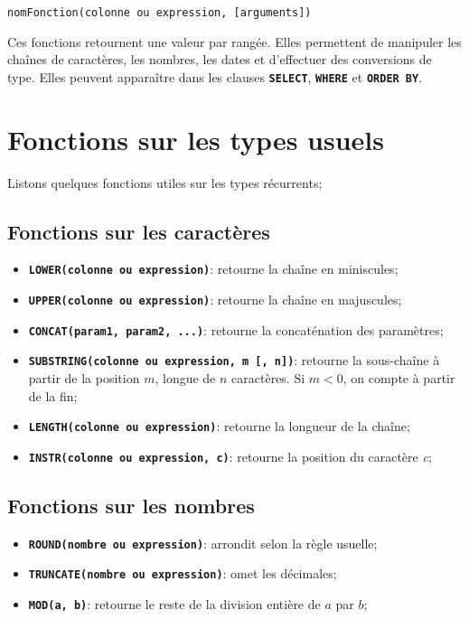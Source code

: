 \documentclass[a4paper, 12pt]{report}
\newcommand{\textSQL}[1]{\texttt{\textbf{#1}}}
\theoremstyle{definition} \newtheorem{ex}{Exemple}
\begin{document}
\begin{lstlisting}[frame=single]
nomFonction(colonne ou expression, [arguments])
\end{lstlisting}

Ces fonctions retournent une valeur par rangée. Elles permettent de manipuler les chaînes de caractères, les nombres, les dates et d'effectuer des conversions de type. Elles peuvent apparaître dans les clauses \textSQL{SELECT}, \textSQL{WHERE} et \textSQL{ORDER BY}.

\section{Fonctions sur les types usuels}
Listons quelques fonctions utiles sur les types récurrents;
\subsection{Fonctions sur les caractères}
\begin{itemize}
\item \textSQL{LOWER(colonne ou expression)}: retourne la chaîne en miniscules;
\item \textSQL{UPPER(colonne ou expression)}: retourne la chaîne en majuscules;
\item \textSQL{CONCAT(param1, param2, ...)}: retourne la concaténation des paramètres;
\item \textSQL{SUBSTRING(colonne ou expression, m [, n])}: retourne la sous-chaîne à partir de la position $m$, longue de $n$ caractères. Si $m<0$, on compte à partir de la fin;
\item \textSQL{LENGTH(colonne ou expression)}: retourne la longueur de la chaîne;
\item \textSQL{INSTR(colonne ou expression, c)}: retourne la position du caractère \emph{c};

\end{itemize}

\subsection{Fonctions sur les nombres}
  \begin{itemize}
\item \textSQL{ROUND(nombre ou expression)}: arrondit selon la règle usuelle;
\item \textSQL{TRUNCATE(nombre ou expression)}: omet les décimales;
\item \textSQL{MOD(a, b)}: retourne le reste de la division entière de $a$ par $b$;
\end{itemize}
\end{document}
